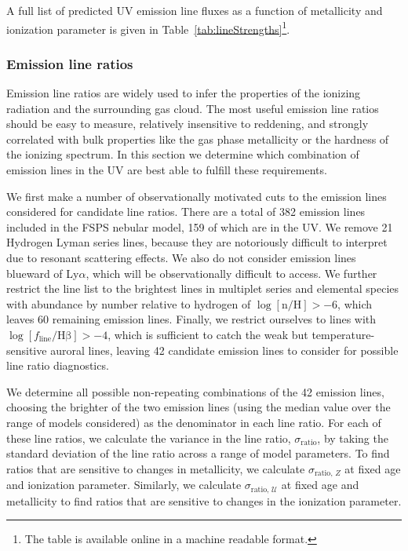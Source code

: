 \documentclass[preprint2]{aastex61}
\newcommand{\FSPS}{{\sc FSPS}\xspace}
\newcommand{\sigmaR}{\ensuremath{\sigma_{\mathrm{ratio}}}\xspace}
\newcommand{\sigmaRU}{\ensuremath{\sigma_{\mathrm{ratio,}\,\mathcal{U}}}\xspace}
\newcommand{\sigmaRZ}{\ensuremath{\sigma_{\mathrm{ratio,}\,Z}}\xspace}
\newcommand{\hb}{\ensuremath{\mathrm{H\beta}}\xspace}
\begin{document}
A full list of predicted UV emission line fluxes as a function of metallicity and ionization parameter is given in Table~\ref{tab:lineStrengths}\footnote{The table is available online in a machine readable format.}.

\subsubsection{Emission line ratios}

Emission line ratios are widely used to infer the properties of the ionizing radiation and the surrounding gas cloud. The most useful emission line ratios should be easy to measure, relatively insensitive to reddening, and strongly correlated with bulk properties like the gas phase metallicity or the hardness of the ionizing spectrum. In this section we determine which combination of emission lines in the UV are best able to fulfill these requirements.

We first make a number of observationally motivated cuts to the emission lines considered for candidate line ratios. There are a total of 382 emission lines included in the \FSPS nebular model, 159 of which are in the UV. We remove 21 Hydrogen Lyman series lines, because they are notoriously difficult to interpret due to resonant scattering effects. We also do not consider emission lines blueward of Ly$\alpha$, which will be observationally difficult to access. We further restrict the line list to the brightest lines in multiplet series and elemental species with abundance by number relative to hydrogen of $\log[ \mathrm{n} / \mathrm{H} ] > -6$, which leaves 60 remaining emission lines. Finally, we restrict ourselves to lines with $\log[ f_{\mathrm{line}} / \hb] > -4$, which is sufficient to catch the weak but temperature-sensitive auroral lines, leaving 42 candidate emission lines to consider for possible line ratio diagnostics.

We determine all possible non-repeating combinations of the 42 emission lines, choosing the brighter of the two emission lines (using the median value over the range of models considered) as the denominator in each line ratio. For each of these line ratios, we calculate the variance in the line ratio, \sigmaR, by taking the standard deviation of the line ratio across a range of model parameters. To find ratios that are sensitive to changes in metallicity, we calculate \sigmaRZ at fixed age and ionization parameter. Similarly, we calculate \sigmaRU at fixed age and metallicity to find ratios that are sensitive to changes in the ionization parameter.
\end{document}
